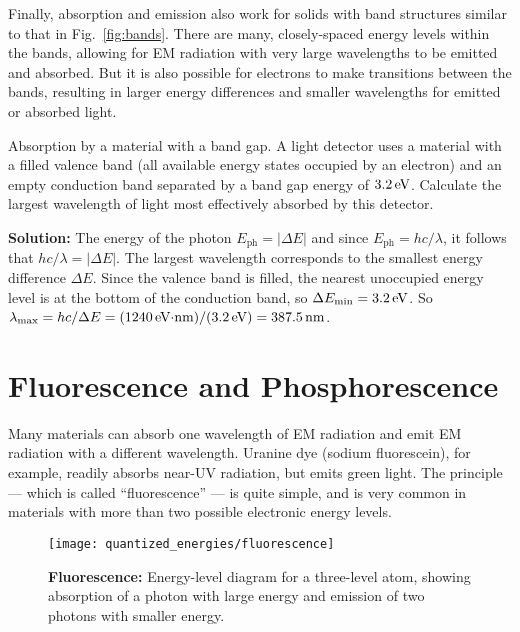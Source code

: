 Finally, absorption and emission also work for solids with band structures
similar to that in Fig.~\ref{fig:bands}. There are many, closely-spaced
energy levels within the bands, allowing for EM radiation with very 
large wavelengths to be emitted and absorbed. But it is also possible for
electrons to make transitions between the bands, resulting in larger
energy differences and smaller wavelengths for emitted or absorbed light.
				
\begin{example}{Absorption by a material with a band gap.}
\label{exam:absorption_bands}
A light detector uses a material with a filled valence band (all available
energy states occupied by an electron) and an empty conduction band separated
by a band gap energy of $3.2\,\mbox{eV}$. Calculate the largest wavelength of light 
most effectively absorbed by this detector.

{\bf Solution:} 
The energy of the photon $E_\text{ph} = |\Delta E|$
and since $E_\text{ph} = hc/\lambda$, it follows that $hc/\lambda = |\Delta E|$.
The largest wavelength corresponds to the smallest energy
difference $\Delta E$. Since the valence band is filled, the nearest 
unoccupied energy level is at the bottom of the conduction band, so
$\Delta E_\text{min} = 3.2\,\mbox{eV}$.
So $\lambda_\text{max} = hc/\Delta E 
            = (1240\,\mbox{eV$\cdot$nm})/(3.2 \,\mbox{eV}) = 387.5\,\mbox{nm}$. 
\end{example}

\section{Fluorescence and Phosphorescence}
\label{sec:fluorescence_phosphorescence}

Many materials can absorb one wavelength of EM radiation and emit EM
radiation with a different wavelength. Uranine dye (sodium fluorescein),
for example, readily absorbs near-UV radiation, but emits green light. The
principle --- which is called ``fluorescence'' --- is quite simple,
and is very common in materials with more than two possible electronic
energy levels.


\begin{figure}
\begin{center}
\texttt{[image: quantized\_energies/fluorescence]}
\end{center}
\caption{{\bf Fluorescence: } Energy-level diagram for a 
three-level atom, showing
absorption of a photon with large energy and emission of two
photons with smaller energy. }
\label{fig:fluorescence}
\end{figure}
		
